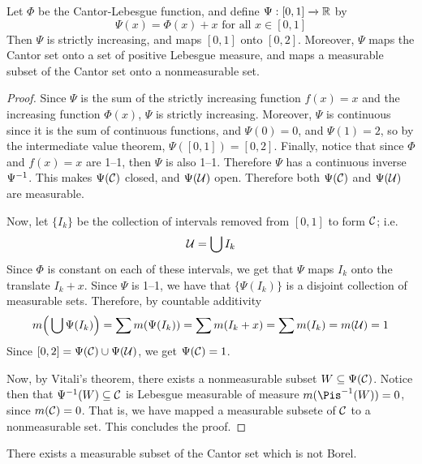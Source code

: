 \begin{lemma}\label{lemma_1.5.3}
    Let $\Phi$ be the Cantor-Lebesgue function, and define $\Psi:[0,1]
    \xrightarrow{} \mathbb{R}$ by
    \begin{equation*}
        \Psi(x)=\Phi(x)+x \text{ for all } x \in [0,1]
    \end{equation*}
    Then $\Psi$ is strictly increasing, and maps $[0,1]$ onto $[0,2]$. Moreover,
    $\Psi$ maps the Cantor set onto a set of positive Lebesgue measure, and
    maps a measurable subset of the Cantor set onto a nonmeasurable set.
\end{lemma}
\begin{proof}
    Since $\Psi$ is the sum of the strictly increasing function $f(x)=x$ and the
    increasing function $\Phi(x)$, $\Psi$ is strictly increasing. Moreover,
    $\Psi$ is continuous since it is the sum of continuous functions, and
    $\Psi(0)=0$, and $\Psi(1)=2$, so by the intermediate value theorem,
    $\Psi([0,1])=[0,2]$. Finally, notice that since $\Phi$ and $f(x)=x$ are
    1--1, then $\Psi$ is also 1--1. Therefore  $\Psi$ has a continuous inverse
    $\Psi^{-1}$. This makes $\Psi(\mathcal{C})$ closed, and $\Psi(\mathcal{U})$ open. Therefore
    both $\Psi(\mathcal{C})$ and $\Psi(\mathcal{U})$ are measurable.

    Now, let $\{I_k\}$ be the collection of intervals removed from $[0,1]$ to
    form $\mathcal{C}$; i.e.
    \begin{equation*}
        \mathcal{U}=\bigcup{I_k}
    \end{equation*}
    Since $\Phi$ is constant on each of these intervals, we get that  $\Psi$
    maps  $I_k$ onto the translate  $I_k+x$. Since $\Psi$ is 1--1, we have that
    $\{\Psi(I_k)\}$ is a disjoint collection of measurable sets. Therefore, by
    countable additivity
    \begin{equation*}
        m\Big{(} \bigcup{\Psi(I_k)} \Big{)}=\sum{m(\Psi(I_k))}=
        \sum{m(I_k+x)}=\sum{m(I_k)}=m(\mathcal{U})=1
    \end{equation*}
    Since $[0,2]=\Psi(\mathcal{C}) \cup \Psi(\mathcal{U})$, we get $\Psi(\mathcal{C})=1$.

    Now, by Vitali's theorem, there exists a nonmeasurable subset $W \subseteq
    \Psi(\mathcal{C})$. Notice then that $\Psi^{-1}(W) \subseteq \mathcal{C}$ is Lebesgue
    measurable of measure $m(\inv{\Pis}(W))=0$, since $m(\mathcal{C})=0$. That is, we
    have mapped a measurable subsete of $\mathcal{C}$ to a nonmeasurable set. This
    concludes the proof.
\end{proof}

\begin{theorem}\label{1.5.4}
    There exists a measurable subset of the Cantor set which is not Borel.
\end{theorem}
